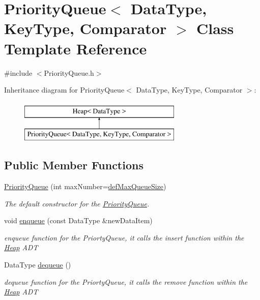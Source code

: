 \hypertarget{class_priority_queue}{}\section{Priority\+Queue$<$ Data\+Type, Key\+Type, Comparator $>$ Class Template Reference}
\label{class_priority_queue}


{\ttfamily \#include $<$Priority\+Queue.\+h$>$}

Inheritance diagram for Priority\+Queue$<$ Data\+Type, Key\+Type, Comparator $>$\+:\begin{figure}[H]
\begin{center}
\leavevmode
\includegraphics[height=2.000000cm]{class_priority_queue}
\end{center}
\end{figure}
\subsection*{Public Member Functions}
\begin{DoxyCompactItemize}
\item 
\hyperlink{class_priority_queue_a47de2a46cff1d6a6ed30a99c94dc1b14}{Priority\+Queue} (int max\+Number=\hyperlink{_priority_queue_8h_a88703212007be018800be64f2f5fde2f}{def\+Max\+Queue\+Size})
\begin{DoxyCompactList}\small\item\em The default constructor for the \hyperlink{class_priority_queue}{Priority\+Queue}. \end{DoxyCompactList}\item 
void \hyperlink{class_priority_queue_a61f3339cf0e87c67ed004f8eff0a1bfa}{enqueue} (const Data\+Type \&new\+Data\+Item)
\begin{DoxyCompactList}\small\item\em enqueue function for the Priorty\+Queue, it calls the insert function within the \hyperlink{class_heap}{Heap} A\+DT \end{DoxyCompactList}\item 
Data\+Type \hyperlink{class_priority_queue_a5bc758e313d6244e672ea6e81d695a46}{dequeue} ()
\begin{DoxyCompactList}\small\item\em dequeue function for the Priorty\+Queue, it calls the remove function within the \hyperlink{class_heap}{Heap} A\+DT \end{DoxyCompactList}\end{DoxyCompactItemize}
